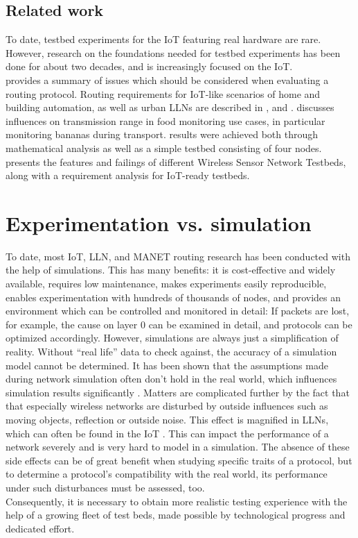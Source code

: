 \documentclass{acm_proc_article-sp}
\begin{document}
\subsection{Related work}
\label{subsec:related_work}
To date, testbed experiments for the IoT featuring real hardware are rare. However, research on the foundations needed for testbed experiments has been done for about two decades, and is increasingly focused on the IoT.\\
\cite{RFC-2501} provides a summary of issues which should be considered when evaluating a routing protocol. Routing requirements for IoT-like scenarios of home and building automation, as well as urban \glspl{LLN} are described in \cite{RFC-5826}, \cite{RFC-5867} and \cite{RFC-5548}.
\cite{food_monitoring} discusses influences on transmission range in food monitoring use cases, in particular monitoring bananas during transport. results were achieved both through mathematical analysis as well as a simple testbed consisting of four nodes.
\cite{testbed-survey} presents the features and failings of different Wireless Sensor Network Testbeds, along with a requirement analysis for IoT-ready testbeds.

\section{Experimentation vs. simulation}
\label{sec:simulation_cons}
To date, most IoT, \gls{LLN}, and \gls{MANET} routing research has been conducted with the help of simulations. This has many benefits: it is cost-effective and widely available, requires low maintenance, makes experiments easily reproducible, enables experimentation with hundreds of thousands of nodes, and provides an environment which can be controlled and monitored in detail: If packets are lost, for example, the cause on layer 0 can be examined in detail, and protocols can be optimized accordingly.
However, simulations are always just a simplification of reality. Without ``real life'' data to check against, the accuracy of a simulation model cannot be determined. It has been shown that the assumptions made during network simulation often don't hold in the real world, which influences simulation results significantly \cite{mistaken-axioms}.
Matters are complicated further by the fact that that especially wireless networks are disturbed by outside influences such as moving objects, reflection or outside noise. This effect is magnified in \glspl{LLN}, which can often be found in the IoT \cite{flex_experimentation}. This can impact the performance of a network severely and is very hard to model in a simulation.
The absence of these side effects can be of great benefit when studying specific traits of a protocol, but to determine a protocol's compatibility with the real world, its performance under such disturbances must be assessed, too.\\
Consequently, it is necessary to obtain more realistic testing experience with the help of a growing fleet of test beds, made possible by technological progress and dedicated effort.
\end{document}
